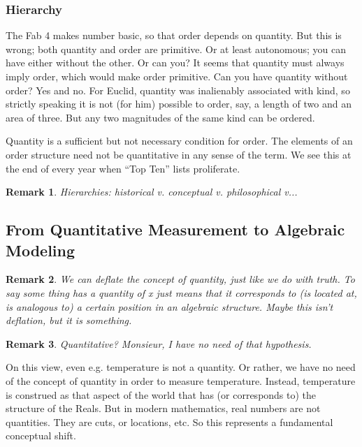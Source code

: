 \documentclass[11pt,twoside]{article}
\newtheorem{remark}{Remark}
\begin{document}
\subsubsection{Hierarchy}
The Fab 4 makes number basic, so that order depends on quantity.  But
this is wrong; both quantity and order are primitive.  Or at least
autonomous; you can have either without the other.  Or can you?  It
seems that quantity must always imply order, which would make order
primitive.  Can you have quantity without order?  Yes and no.  For
Euclid, quantity was inalienably associated with kind, so strictly
speaking it is not (for him) possible to order, say, a length of two
and an area of three.  But any two magnitudes of the same kind can be
ordered.

Quantity is a sufficient but not necessary condition for order.  The
elements of an order structure need not be quantitative in any sense
of the term.  We see this at the end of every year when ``Top Ten''
lists proliferate.

\begin{remark}
  Hierarchies: historical v. conceptual v. philosophical v...
\end{remark}

\subsection{From Quantitative Measurement to Algebraic Modeling}

\begin{remark}
  We can deflate the concept of quantity, just like we do with truth.
  To say some thing has a quantity of x just means that it corresponds
  to (is located at, is analogous to) a certain position in an algebraic
  structure.  Maybe this isn't deflation, but it is something.
\end{remark}

\begin{remark}
  Quantitative?  Monsieur, I have no need of that hypothesis.
\end{remark}

On this view, even e.g. temperature is not a quantity.  Or rather, we
have no need of the concept of quantity in order to measure
temperature.  Instead, temperature is construed as that aspect of the
world that has (or corresponds to) the structure of the Reals.  But in
modern mathematics, real numbers are not quantities.  They are cuts,
or locations, etc.  So this represents a fundamental conceptual shift.
\end{document}
